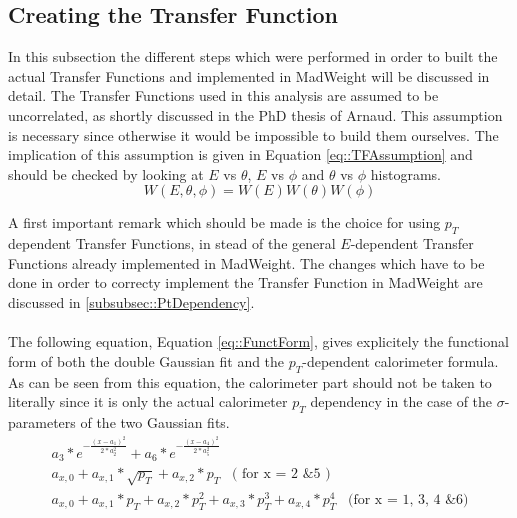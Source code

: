 \subsection{Creating the Transfer Function}
In this subsection the different steps which were performed in order to built the actual Transfer Functions and implemented in MadWeight will be discussed in detail. The Transfer Functions used in this analysis are assumed to be uncorrelated, as shortly discussed in the PhD thesis of Arnaud. This assumption is necessary since otherwise it would be impossible to build them ourselves. The implication of this assumption is given in Equation \ref{eq::TFAssumption} and should be checked by looking at $E$ vs $\theta$, $E$ vs $\phi$ and $\theta$ vs $\phi$ histograms.
\begin{equation} \label{eq::TFAssumption}
 W(E, \theta, \phi) = W(E) W(\theta) W(\phi)
\end{equation}

A first important remark which should be made is the choice for using $p_{T}$ dependent Transfer Functions, in stead of the general $E$-dependent Transfer Functions already implemented in MadWeight. The changes which have to be done in order to correcty implement the Transfer Function in MadWeight are discussed in \ref{subsubsec::PtDependency}.\\
\\
The following equation, Equation \ref{eq::FunctForm}, gives explicitely the functional form of both the double Gaussian fit and the $p_T$-dependent calorimeter formula. As can be seen from this equation, the calorimeter part should not be taken to literally since it is only the actual calorimeter $p_T$ dependency in the case of the $\sigma$-parameters of the two Gaussian fits.
\begin{eqnarray}
 a_3 * e^{-\frac{(x-a_1)^2}{2*a_{2}^{2}}} + a_6 * e^{-\frac{(x-a_4)^2}{2*a_{5}^{2}}} \nonumber \\
 a_{x,0} + a_{x,1} * \sqrt{p_T} + a_{x,2} * p_T \;\;\;  \textrm{( for x = 2 \& 5 )}\nonumber \\
 a_{x,0} + a_{x,1} * p_T + a_{x,2} * p_{T}^{2} + a_{x,3} * p_{T}^{3} + a_{x,4} * p_{T}^{4} \;\;\; \textrm{(for x = 1, 3, 4 \& 6)} \label{eq::FunctForm}
\end{eqnarray}

